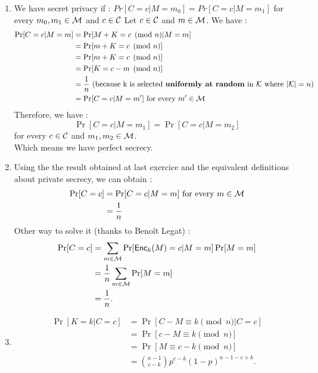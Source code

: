 \begin{solution}
  \begin{enumerate}
    \item
      We have secret privacy if : $Pr[C = c | M = m_0] = Pr[C = c | M = m_1] $ for every $m_0, m_1 \in \mathcal{M}$ and $c \in \mathcal{C}$ \newline \newline
      Let $c \in \mathcal{C}$ and $m\in \mathcal{M}$.
      We have :
      \begin{align*}
        \Pr[C = c | M = m]
        & = \Pr[M + K = c \pmod{n} | M = m]\\
        & = \Pr[m + K = c \pmod{n}]\\
        & = \Pr[m + K = c \pmod{n}]\\
        & = \Pr[K = c - m \pmod{n}]\\
        & = \frac{1}{n} \text{ (because k is selected \textbf{uniformly at random} in } \mathcal{K} \text{ where } |\mathcal{K}| = n )\\
        & = \Pr[C = c | M = m'] \text{ for every } m' \in \mathcal{M}
      \end{align*}
      Therefore, we have :
      \[
        \Pr[C = c | M = m_1] = \Pr[C = c | M = m_2]
      \]
      for every $c \in \mathcal{C}$ and $m_1,m_2 \in \mathcal{M}$. \\
      Which means we have perfect secrecy.
    \item
        Using the the result obtained at last exercice and the equivalent definitions about private secrecy, we can obtain :
      \begin{align*}
          \Pr[C = c]  & = \Pr[C = c | M = m] \text{ for every } m \in \mathcal{M} \\
          & = \frac{1}{n}
      \end{align*}
      Other way to solve it (thanks to Benoît Legat) : 
      \begin{align*}
        \Pr[C = c]
        & = \sum_{m \in \mathcal{M}} \Pr[\operatorname{\mathsf{Enc}}_k(M) = c | M = m] \Pr[M = m]\\
        & = \frac{1}{n} \sum_{m \in \mathcal{M}} \Pr[M = m]\\
        & = \frac{1}{n}.
      \end{align*}
    \item
      \begin{align*}
        \Pr[K = k | C = c]
        & = \Pr[C - M \equiv k \pmod{n} | C = c]\\
        & = \Pr[c - M \equiv k \pmod{n}]\\
        & = \Pr[M \equiv c - k \pmod{n}]\\
        & = {n-1 \choose c-k} p^{c-k} (1-p)^{n-1-c+k}.
      \end{align*}
  \end{enumerate}
\end{solution}



